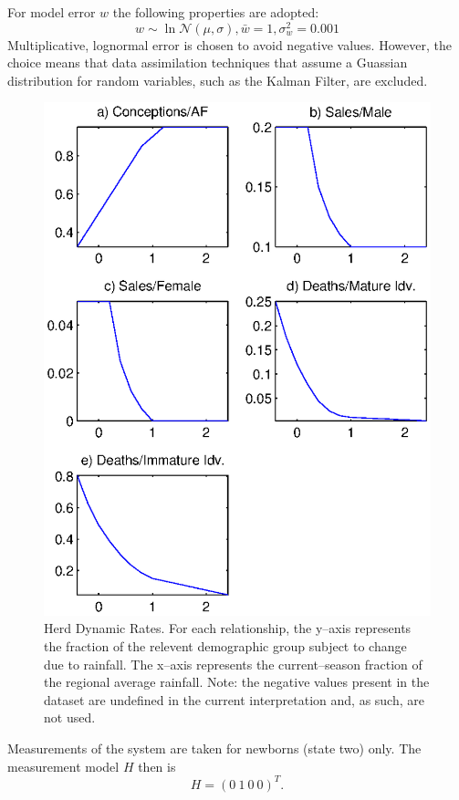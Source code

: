 \documentclass[fleqn, letterpaper]{article}
\numberwithin{figure}{section}
\begin{document}
For model error $w$ the following properties are adopted:
\[w\sim\ln\mathcal{N}(\mu,\sigma), \bar{w}=1, \sigma_w^2 = 0.001\]
Multiplicative, lognormal error is chosen to avoid negative values.
However, the choice means that data assimilation techniques that assume a Guassian distribution for random variables, such as the Kalman Filter, are excluded.
\begin{figure}
\includegraphics[width=1.0\textwidth]{refrel}
\caption{Herd Dynamic Rates. For each relationship, the y--axis represents the fraction of the relevent demographic group subject to change due to rainfall. The x--axis represents the current--season fraction of the regional average rainfall. Note: the negative values present in the dataset are undefined in the current interpretation and, as such, are not used.}
\label{rferels}
\end{figure}

Measurements of the system are taken for newborns (state two) only. The measurement model $H$ then is
\[H = (0\ 1\ 0\ 0)^T.\]
\end{document}
